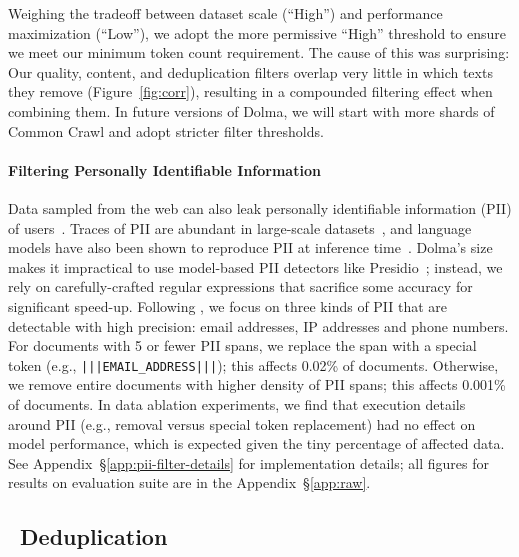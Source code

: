 \documentclass{article}
\newcommand{\dolma}{Dolma\xspace}
\newcommand{\toolkitDedupe}{{\color{VarnishNovemberThree}\faCopy}\xspace}
\begin{document}
Weighing the tradeoff between dataset scale (``High'') and performance maximization (``Low''), we adopt the more permissive ``High'' threshold to ensure we meet our minimum token count requirement.
The cause of this was surprising: Our quality, content, and deduplication filters overlap very little in which texts they remove (Figure~\ref{fig:corr}), resulting in a compounded filtering effect when combining them.
In future versions of \dolma, we will start with more shards of Common Crawl and adopt stricter filter thresholds.

\paragraph{Filtering Personally Identifiable Information}

Data sampled from the web can also leak personally identifiable information (PII) of users~\citep{luccioni-viviano-2021-whats,subramani-etal-2023-detecting}.
Traces of PII are abundant in large-scale datasets~\citep{wimbd}, and 
language models have also been shown to reproduce PII at inference time~\citep{Carlini2022-mj,Chen2023-zm}. 
\dolma's size makes it impractical to use model-based PII detectors like Presidio~\citep{presidio};
instead, we rely on carefully-crafted regular expressions that sacrifice some accuracy for significant speed-up.
Following \citet{subramani-etal-2023-detecting}, we focus on three kinds of PII that are detectable with high precision: 
email addresses, IP addresses and phone numbers.
For documents with 5 or fewer PII spans, we replace the span with a special token (e.g., \texttt{|\negthickspace|\negthickspace|EMAIL\_ADDRESS|\negthickspace|\negthickspace|}); this affects 0.02\% of documents.
Otherwise, we remove entire documents with higher density of PII spans; this affects 0.001\% of documents.
In data ablation experiments, we find that execution details around PII (e.g., removal versus special token replacement) had no effect on model performance, which is expected given the tiny percentage of affected data.
See Appendix~\S\ref{app:pii-filter-details} for implementation details; all figures for results on evaluation suite are in the Appendix~\S\ref{app:raw}.

\subsection{\toolkitDedupe~Deduplication} 
\label{sub:web:dedup}
\end{document}
